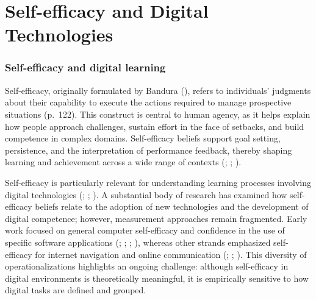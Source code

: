 \documentclass[
  letterpaper,
  DIV=11,
  numbers=noendperiod]{scrartcl}
\begin{document}
\section{Self-efficacy and Digital
Technologies}\label{self-efficacy-and-digital-technologies}

\subsubsection{Self-efficacy and digital
learning}\label{self-efficacy-and-digital-learning}

Self-efficacy, originally formulated by Bandura
(), refers to individuals'
judgments about their capability to execute the actions required to
manage prospective situations (p.~122). This construct is central to
human agency, as it helps explain how people approach challenges,
sustain effort in the face of setbacks, and build competence in complex
domains. Self-efficacy beliefs support goal setting, persistence, and
the interpretation of performance feedback, thereby shaping learning and
achievement across a wide range of contexts
(;
;
).

Self-efficacy is particularly relevant for understanding learning
processes involving digital technologies
(;
;
). A substantial
body of research has examined how self-efficacy beliefs relate to the
adoption of new technologies and the development of digital competence;
however, measurement approaches remain fragmented. Early work focused on
general computer self-efficacy and confidence in the use of specific
software applications (; ; ;
), whereas
other strands emphasized self-efficacy for internet navigation and
online communication (; ;
). This diversity
of operationalizations highlights an ongoing challenge: although
self-efficacy in digital environments is theoretically meaningful, it is
empirically sensitive to how digital tasks are defined and grouped.
\end{document}
